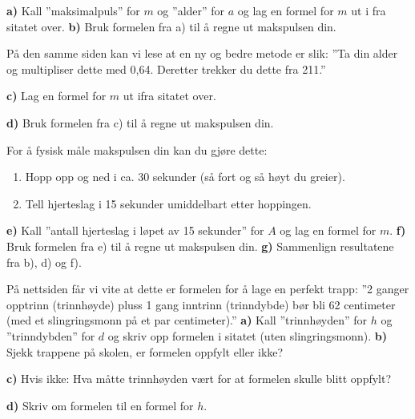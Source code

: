 \textbf{a)} Kall ''maksimalpuls'' for $ m $ og ''alder'' for $ a $ og lag en formel for $ m $ ut i fra sitatet over. \os
\textbf{b)} Bruk formelen fra a) til å regne ut makspulsen din.\vsk

På den samme siden kan vi lese at en ny og bedre metode er slik:\os
''Ta din alder og multipliser dette med 0,64. Deretter trekker du dette fra 211.''\os

\textbf{c)} Lag en formel for $ m $ ut ifra sitatet over.\os

\textbf{d)} Bruk formelen fra c) til å regne ut makspulsen din.

\vsk
For å fysisk måle makspulsen din kan du gjøre dette:
\begin{enumerate}
	\item Hopp opp og ned i ca. 30 sekunder (så fort og så høyt du greier).
	\item Tell hjerteslag i 15 sekunder umiddelbart etter hoppingen.
\end{enumerate}
\textbf{e)} Kall ''antall hjerteslag i løpet av 15 sekunder'' for $ A $ og lag en formel for $ m $.\os
\textbf{f)} Bruk formelen fra e) til å regne ut makspulsen din.\os
\textbf{g)} Sammenlign resultatene fra b), d) og f).

\nes
{}
På nettsiden  får vi vite at dette er formelen for å lage en perfekt trapp:\os
''2 ganger opptrinn (trinnhøyde) pluss 1 gang inntrinn (trinndybde) bør bli 62 centimeter (med et slingringsmonn på et par centimeter).'' \os
\textbf{a)} Kall ''trinnhøyden'' for $ h $ og ''trinndybden'' for $ d $ og skriv opp formelen i sitatet (uten slingringsmonn).\os
\textbf{b)} Sjekk trappene på skolen, er formelen oppfylt eller ikke?\os

\textbf{c)} Hvis ikke: Hva måtte trinnhøyden vært for at formelen skulle blitt oppfylt?\os

\textbf{d)} Skriv om formelen til en formel for $ h $.

